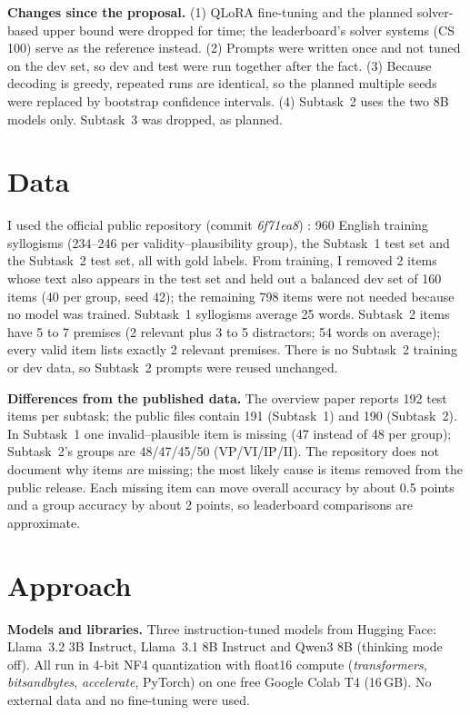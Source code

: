 \documentclass[11pt,letterpaper]{article}
\begin{document}
\textbf{Changes since the proposal.} (1) QLoRA fine-tuning and the planned solver-based upper bound were dropped for time; the leaderboard's solver systems (CS 100) serve as the reference instead. (2) Prompts were written once and not tuned on the dev set, so dev and test were run together after the fact. (3) Because decoding is greedy, repeated runs are identical, so the planned multiple seeds were replaced by bootstrap confidence intervals. (4) Subtask~2 uses the two 8B models only. Subtask~3 was dropped, as planned.

\section{Data}
I used the official public repository (commit \textit{6f71ea8}) \cite{repo}: 960 English training syllogisms (234--246 per validity--plausibility group), the Subtask~1 test set and the Subtask~2 test set, all with gold labels. From training, I removed 2 items whose text also appears in the test set and held out a balanced dev set of 160 items (40 per group, seed 42); the remaining 798 items were not needed because no model was trained. Subtask~1 syllogisms average 25 words. Subtask~2 items have 5 to 7 premises (2 relevant plus 3 to 5 distractors; 54 words on average); every valid item lists exactly 2 relevant premises. There is no Subtask~2 training or dev data, so Subtask~2 prompts were reused unchanged.

\textbf{Differences from the published data.} The overview paper reports 192 test items per subtask; the public files contain 191 (Subtask~1) and 190 (Subtask~2). In Subtask~1 one invalid--plausible item is missing (47 instead of 48 per group); Subtask~2's groups are 48/47/45/50 (VP/VI/IP/II). The repository does not document why items are missing; the most likely cause is items removed from the public release. Each missing item can move overall accuracy by about 0.5 points and a group accuracy by about 2 points, so leaderboard comparisons are approximate.

\section{Approach}
\textbf{Models and libraries.} Three instruction-tuned models from Hugging Face: Llama~3.2 3B Instruct, Llama~3.1 8B Instruct and Qwen3 8B (thinking mode off). All run in 4-bit NF4 quantization with float16 compute (\textit{transformers}, \textit{bitsandbytes}, \textit{accelerate}, PyTorch) on one free Google Colab T4 (16\,GB). No external data and no fine-tuning were used.
\end{document}
